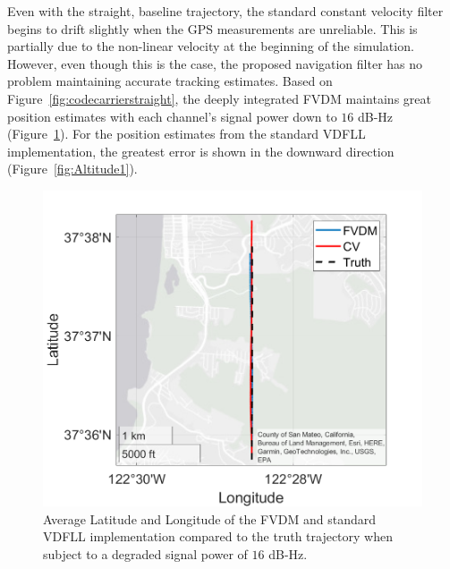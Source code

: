 Even with the straight, baseline trajectory, the standard constant velocity filter begins to drift slightly when the GPS measurements are unreliable. This is partially due to the non-linear velocity at the beginning of the simulation. However, even though this is the case, the proposed navigation filter has no problem maintaining accurate tracking estimates. Based on Figure~\ref{fig:codecarrierstraight}, the deeply integrated FVDM maintains great position estimates with each channel's signal power down to \(16\) dB-Hz (Figure~\ref{fig:GEOPLOT2}). For the position estimates from the standard VDFLL implementation, the greatest error is shown in the downward direction (Figure~\ref{fig:Altitude1}).

\begin{figure}[!ht]
    \centering
    \includegraphics[width=0.5\linewidth]{Figures/straight/15/GEOPLOT.png}
    \caption{Average Latitude and Longitude of the FVDM and standard VDFLL implementation compared to the truth trajectory when subject to a degraded signal power of \(16\) dB-Hz.}\label{fig:GEOPLOT2}
\end{figure}




